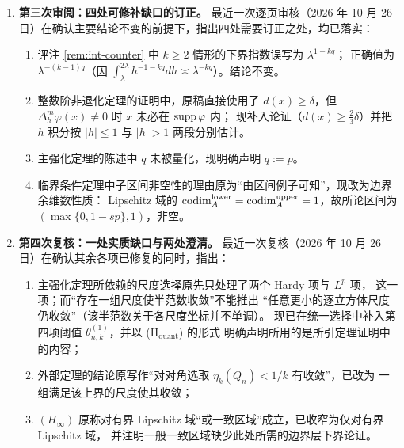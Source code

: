 \begin{enumerate}
\item \textbf{第三次审阅：四处可修补缺口的订正。}
  最近一次逐页审核（2026 年 10 月 26 日）在确认主要结论不变的前提下，指出四处需要订正之处，均已落实：
  \begin{enumerate}[label=(\arabic*)]
    \item 评注 \ref{rem:int-counter} 中 $k\ge2$ 情形的下界指数误写为 $\lambda^{1-kq}$；
          正确值为 $\lambda^{-(k-1)q}$（因 $\int_\lambda^{2\lambda}h^{-1-kq}dh\asymp\lambda^{-kq}$）。结论不变。
    \item 整数阶非退化定理的证明中，原稿直接使用了 $d(x)\ge\delta$，但 $\Delta_h^m\varphi(x)\ne0$ 时 $x$ 未必在 $\operatorname{supp}\varphi$ 内；
          现补入论证（$d(x)\ge\tfrac23\delta$）并把 $h$ 积分按 $|h|\le1$ 与 $|h|>1$ 两段分别估计。
    \item 主强化定理的陈述中 $q$ 未被量化，现明确声明 $q:=p$。
    \item 临界条件定理中子区间非空性的理由原为``由区间例子可知''，现改为边界余维数性质：
          Lipschitz 域的 $\operatorname{codim}_{A}^{\mathrm{lower}}=\operatorname{codim}_{A}^{\mathrm{upper}}=1$，故所论区间为 $(\max\{0,1-sp\},1)$，非空。
  \end{enumerate}
\item \textbf{第四次复核：一处实质缺口与两处澄清。}
  最近一次复核（2026 年 10 月 26 日）在确认其余各项已修复的同时，指出：
  \begin{enumerate}[label=(\arabic*)]
    \item 主强化定理所依赖的尺度选择原先只处理了两个 Hardy 项与 $L^p$ 项，
          这一项；而“存在一组尺度使半范数收敛”不能推出
          “任意更小的逐立方体尺度仍收敛”（该半范数关于各尺度坐标并不单调）。
          现已在统一选择中补入第四项阈值 $\theta^{(1)}_{n,k}$，并以 (H$_{\mathrm{quant}}$) 的形式
          明确声明所用的是所引定理证明中的内容；
    \item 外部定理的结论原写作“对对角选取 $\eta_k(Q_n)<1/k$ 有收敛”，已改为
          一组满足该上界的尺度使其收敛；
    \item $(H_{\infty})$ 原称对有界 Lipschitz 域“或一致区域”成立，已收窄为仅对有界 Lipschitz 域，
          并注明一般一致区域缺少此处所需的边界层下界论证。
  \end{enumerate}


\end{enumerate}

